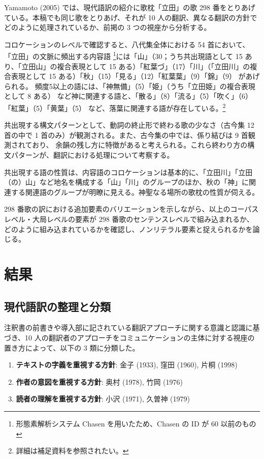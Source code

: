 \documentclass[
  letterpaper,
  DIV=11,
  numbers=noendperiod]{scrartcl}
\begin{document}
Yamamoto (2005) では、現代語訳の紹介に歌枕「立田」の歌 298
番をとりあげている。本稿でも同じ歌をとりあげ、それが 10
人の翻訳、異なる翻訳の方針でどのように処理されているか、前掲の 3
つの視座から分析する。

コロケーションのレベルで確認すると、八代集全体における 54 首において、
「立田」の文脈に頻出する内容語
\footnote{形態素解析システム Chasen を用いたため、Chasen の ID が 60
  以前のもの}には「山」（30；うち共出現語として 15
あり、「立田山」の複合表現として 15
ある）「紅葉づ」（17）「川」（「立田川」の複合表現として 15
ある）「秋」（15）「見る」（12）「紅葉葉」（9）「錦」（9）
があげられる。
頻度5以上の語には、「神無備」（5）「姫」（うち「立田姫」の複合表現として
8 ある）
など神に関連する語と、「散る」（8）「流る」（5）「吹く」（6）「紅葉」（5）「黄葉」（5）
など、落葉に関連する語が存在している。\footnote{詳細は補足資料を参照されたい。}

共出現する構文パターンとして、動詞の終止形で終わる歌の少なさ（古今集 12
首の中で 1 首のみ）が観測される。また、古今集の中では、係り結びは 9
首観測されており、
余韻の残し方に特徴があると考えられる。これら終わり方の構文パターンが、翻訳における処理について考察する。

共出現する語の性質は、内容語のコロケーションは基本的に、「立田川」「立田（の）山」など地名を構成する「山」「川」のグループのほか、秋の「神」に関連する関連語のグループが明瞭に見える。神聖なる場所の歌枕の性質が伺える。

298
番歌の訳における追加要素のバリエーションを示しながら、以上のコーパスレベル・大局レベルの要素が
298
番歌のセンテンスレベルで組み込まれるか、どのように組み込まれているかを確認し、ノンリテラル要素と捉えられるかを論じる。

\section{結果}\label{sec-results}

\subsection{現代語訳の整理と分類}\label{ux73feux4ee3ux8a9eux8a33ux306eux6574ux7406ux3068ux5206ux985e}

注釈書の前書きや導入部に記されている翻訳アプローチに関する意識と認識に基づき、10
人の翻訳者のアプローチをコミュニケーションの主体に対する視座の置き方によって、以下の
3 類に分類した。

\begin{enumerate}
\def\labelenumi{\arabic{enumi}.}
\item
  \textbf{テキストの字義を重視する方針}: 金子 (1933), 窪田 (1960), 片桐
  (1998)
\item
  \textbf{作者の意図を重視する方針}: 奥村 (1978), 竹岡 (1976)
\item
  \textbf{読者の理解を重視する方針}: 小沢 (1971), 久曽神 (1979)
\end{enumerate}
\end{document}
